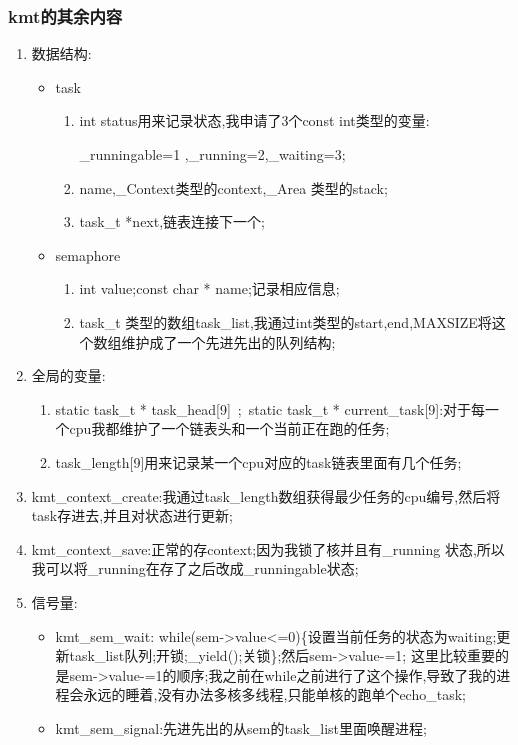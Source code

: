 \documentclass[11pt, a4paper, UTF8]{ctexart}
\begin{document}
\subsubsection{kmt的其余内容}
\begin{enumerate}
\item 数据结构:
\begin{itemize}\item task \begin{enumerate}
    \item int status用来记录状态,我申请了3个const int类型的变量:
    
   \_runningable=1 ,\_running=2,\_waiting=3; 
   \item name,\_Context类型的context,\_Area 类型的stack;
   \item task\_t *next,链表连接下一个; 
\end{enumerate}
\item semaphore 
\begin{enumerate}
\item int value;const char * name;记录相应信息;
\item task\_t 类型的数组task\_list,我通过int类型的start,end,MAXSIZE将这个数组维护成了一个先进先出的队列结构;
\end{enumerate}
\end{itemize}
\item 全局的变量:\begin{enumerate}
\item static task\_t * task\_head[9]~;~static task\_t * current\_task[9]:对于每一个cpu我都维护了一个链表头和一个当前正在跑的任务;
\item task\_length[9]用来记录某一个cpu对应的task链表里面有几个任务;
\end{enumerate}
\item kmt\_context\_create:我通过task\_length数组获得最少任务的cpu编号,然后将task存进去,并且对状态进行更新;
\item kmt\_context\_save:正常的存context;因为我锁了核并且有\_running 状态,所以我可以将\_running在存了之后改成\_runningable状态; 
\item 信号量:
\begin{itemize}
\item kmt\_sem\_wait: while(sem->value<=0)\{设置当前任务的状态为waiting;更新task\_list队列;开锁;\_yield();关锁\};然后sem->value-=1;
这里比较重要的是sem->value-=1的顺序;我之前在while之前进行了这个操作,导致了我的进程会永远的睡着,没有办法多核多线程,只能单核的跑单个echo\_task;
\item kmt\_sem\_signal:先进先出的从sem的task\_list里面唤醒进程;


\end{itemize}
\end{enumerate}
\end{document}
